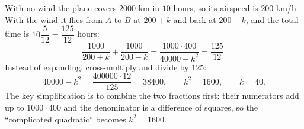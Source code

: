 With no wind the plane covers $2000$ km in $10$ hours, so its airspeed is $200$ km/h. With the wind it flies from $A$ to $B$ at $200+k$ and back at $200-k$, and the total time is $10\dfrac{5}{12}=\dfrac{125}{12}$ hours:
\[
\dfrac{1000}{200+k}+\dfrac{1000}{200-k}=\dfrac{1000\cdot400}{40000-k^2}=\dfrac{125}{12}.
\]
Instead of expanding, cross-multiply and divide by $125$:
\[
40000-k^2=\dfrac{400000\cdot12}{125}=38400,\qquad k^2=1600,\qquad k=\boxed{40}.
\]
The key simplification is to combine the two fractions first: their numerators add up to $1000\cdot400$ and the denominator is a difference of squares, so the ``complicated quadratic'' becomes $k^2=1600$.
